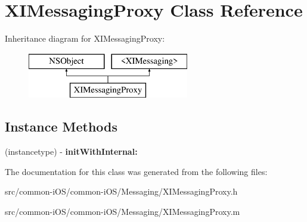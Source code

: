 \hypertarget{interface_x_i_messaging_proxy}{}\section{X\+I\+Messaging\+Proxy Class Reference}
\label{interface_x_i_messaging_proxy}
Inheritance diagram for X\+I\+Messaging\+Proxy\+:\begin{figure}[H]
\begin{center}
\leavevmode
\includegraphics[height=2.000000cm]{interface_x_i_messaging_proxy}
\end{center}
\end{figure}
\subsection*{Instance Methods}
\begin{DoxyCompactItemize}
\item 
\hypertarget{interface_x_i_messaging_proxy_a6ca0e27349e45d383e05c092d36c0ef1}{}\label{interface_x_i_messaging_proxy_a6ca0e27349e45d383e05c092d36c0ef1} 
(instancetype) -\/ {\bfseries init\+With\+Internal\+:}
\end{DoxyCompactItemize}


The documentation for this class was generated from the following files\+:\begin{DoxyCompactItemize}
\item 
src/common-\/i\+O\+S/common-\/i\+O\+S/\+Messaging/X\+I\+Messaging\+Proxy.\+h\item 
src/common-\/i\+O\+S/common-\/i\+O\+S/\+Messaging/X\+I\+Messaging\+Proxy.\+m\end{DoxyCompactItemize}
